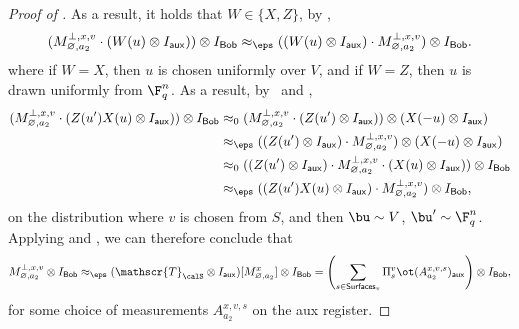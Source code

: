 \documentclass[11pt]{article}
\newcommand{\twirl}{\mathscr{T}}
\newcommand{\reg}[1]{{\mathsf{#1}}}
\newcommand{\surfaces}[1]{\mathsf{Surfaces}_{#1}}
\begin{document}
\begin{proof}[Proof of ]
As a result, it holds that $W \in \{X,Z\}$, by , 
\begin{equation*}
(M_{\varnothing, a_2}^{\bot, x , v}\cdot (W(u)\otimes I_{\reg{aux}})) \otimes I_{\reg{Bob}}
\approx_{\eps} ((W(u)\otimes I_{\reg{aux}}) \cdot M_{\varnothing,
  a_2}^{\bot, x, v}) \otimes I_{\reg{Bob}}.
\end{equation*}
where if $W = X$, then $u$ is chosen uniformly over $V$, and
if $W = Z$, then $u$ is drawn uniformly from $\F_q^n$.
As a result, by~ and ,
\begin{align*}
(M_{\varnothing, a_2}^{\bot, x, v} \cdot (Z(u') X(u)\otimes I_{\reg{aux}})) \otimes I_{\reg{Bob}}
& \approx_{0}(M_{\varnothing, a_2}^{\bot,x,v} \cdot (Z(u')\otimes I_{\reg{aux}})) \otimes (X(-u)\otimes I_{\reg{aux}})\\
& \approx_{\eps}((Z(u')\otimes I_{\reg{aux}}) \cdot M_{\varnothing, a_2}^{\bot,x,v}) \otimes (X(-u)\otimes I_{\reg{aux}})\\
& \approx_{0}((Z(u')\otimes I_{\reg{aux}} )\cdot M_{\varnothing,a_2}^{\bot,x,v} \cdot (X(u) \otimes I_{\reg{aux}})) \otimes I_{\reg{Bob}}\\
& \approx_{\eps}((Z(u') X(u)\otimes I_{\reg{aux}}) \cdot
                                                                                                                                    M_{\varnothing,
                                                                                                                                    a_2}^{\bot,x,
                                                                                                                                    v})
                                                                                                                                    \otimes I_{\reg{Bob}},
\end{align*}
on the distribution where $v$ is chosen from $S$, and then $\bu \sim V$, $\bu' \sim \F_q^n$.
Applying  and ,
we can therefore conclude that
\begin{equation*}
M_{\varnothing, a_2}^{\bot, x,v} \otimes I_{\reg{Bob}}
\approx_{\eps} (\twirl_{\calS} \otimes I_{\reg{aux}})[M_{\varnothing, a_2}^x]
\otimes I_{\reg{Bob}}
= \left(\sum_{s \in \surfaces{v}} \Pi^{v}_s \ot (A^{x,v,s}_{a_2})_{\reg{aux}}\right)
\otimes I_{\reg{Bob}}, 
\end{equation*}
for some choice of measurements $A^{x,v,s}_{a_2}$ on the aux register.
\end{proof}
\end{document}
